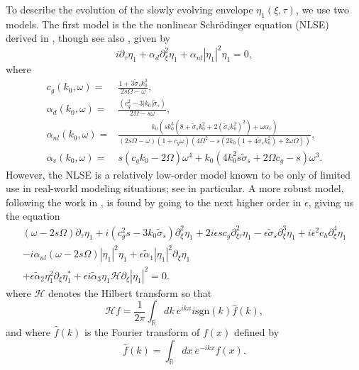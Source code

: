 \documentclass[a4paper,11pt]{article}
\newcommand{\pd}{\partial}
\begin{document}
To describe the evolution of the slowly evolving envelope $\eta_{1}(\xi,\tau)$, we use two models.  The first model is the the nonlinear Schr\"{o}dinger equation (NLSE) derived in \cite{curtis8}, though see also \cite{thomas2012nonlinear}, given by 
\begin{equation}
i\pd_{\tau}\eta_{1} + \alpha_{d}\pd_{\xi}^{2}\eta_{1} + \alpha_{nl}\left|\eta_{1} \right|^{2}\eta_{1} = 0, 
\label{nlse}
\end{equation}
where 
\begin{align*}
c_{g}(k_{0},\omega) = & \frac{1+3\tilde{\sigma}_{s}k_{0}^{2}}{2s\Omega - \omega},\\
\alpha_{d}(k_{0},\omega) = & \frac{(c^2_{g} - 3|k_{0}|\tilde{\sigma}_{s})}{2\Omega-s\omega},\\
\alpha_{nl}(k_{0},\omega) = & \frac{k_{0}\left( sk_{0}^{3}\left(8 + \tilde{\sigma}_{s}k_{0}^{2} + 2(\tilde{\sigma}_{s}k_{0}^{2})^{2}\right) + \omega \alpha_{v}\right)}{\left(2s\Omega -\omega\right)(1+c_{g}\omega)\left(4\Omega^2-s(2k_{0}(1+4\tilde{\sigma}_{s}k_{0}^{2})+2\omega\Omega)\right)},\\
\alpha_{v}(k_{0},\omega) = & s(c_g k_0  - 2\Omega ) \omega^4 + k_{0}(4 k_{0}^{2} s \tilde{\sigma}_{s} + 2 \Omega c_g  -s) \omega^3.
\end{align*}
However, the NLSE is a relatively low-order model known to be only of limited use in real-world modeling situations; see \cite{sergeeva2} in particular.  A more robust model, following the work in \cite{dysthe1}, is found by going to the next higher order in $\epsilon$, giving us the equation
\begin{multline}
(\omega-2s\Omega)\pd_{\tau}\eta_{1} + i(c_{g}^{2}s-3k_{0}\tilde{\sigma}_{s})\pd_{\xi}^{2}\eta_{1} + 2i\epsilon s c_{g}\pd^{2}_{\xi\tau}\eta_{1} - \epsilon\tilde{\sigma}_{s} \pd^{3}_{\xi}\eta_{1} + i\epsilon^{2}c_{h}\pd_{\xi}^{4}\eta_{1} \\
- i \alpha_{nl}(\omega-2s\Omega)\left|\eta_{1}\right|^{2}\eta_{1}
+ \epsilon \tilde{\alpha}_{1}\left|\eta_{1}\right|^{2}\pd_{\xi}\eta_{1}\\
+ \epsilon\tilde{\alpha}_{2}\eta_{1}^{2}\pd_{\xi}\eta^{\ast}_{1} +
\epsilon i\tilde{\alpha}_{3}\eta_{1}\mathcal{H}\pd_{\xi}\left|\eta_{1}\right|^{2}= 0.
\label{dysthe}
\end{multline}
where $\mathcal{H}$ denotes the Hilbert transform so that 
\[
\mathcal{H}f = \frac{1}{2\pi}\int_{\mathbb{R}}dk~ e^{ikx}  i\mbox{sgn}(k) \hat{f}(k),
\]
and where $\hat{f}(k)$ is the Fourier transform of $f(x)$ defined by
\[
\hat{f}(k) = \int_{\mathbb{R}}dx~ e^{-ikx}f(x).
\]
\end{document}

